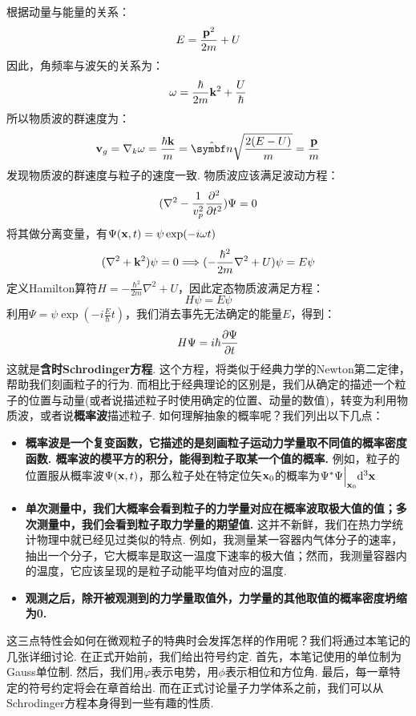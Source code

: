 根据动量与能量的关系：
\[
E = \frac{\mathbf{p}^2}{2m} + U
\]
因此，角频率与波矢的关系为：
\[
\omega = \frac{\hbar}{2m}\mathbf{k}^2 + \frac{U}{\hbar}
\]
所以物质波的群速度为：
\[
\mathbf{v}_{g} = \nabla_{k}\omega = \frac{\hbar\vk}{m} = \uv{n}\sqrt{\frac{2(E-U)}{m}} = \frac{\vp}{m}
\]
发现物质波的群速度与粒子的速度一致. 物质波应该满足波动方程：
\[
(\nabla^2-\frac{1}{v_{p}^2}\frac{\partial^{2} }{\partial{t}^{2}})\Psi = 0
\]
将其做分离变量，有\(\Psi(\mathbf{x},t) = \psi\exp(-i\omega t)\)
\[
(\nabla^2 + \mathbf{k}^2)\psi = 0 \Longrightarrow (-\frac{\hbar^2}{2m}\nabla^2+U)\psi = E\psi
\]
定义Hamilton算符\(H = -\frac{\hbar^2}{2m}\nabla^2+U\)，因此定态物质波满足方程：
\[
H\psi = E\psi
\]
利用\(\Psi=\psi\exp(-i\frac{E}{\hbar}t)\)，我们消去事先无法确定的能量\(E\)，得到：
\[
H\Psi = i\hbar\frac{\partial{\Psi}}{\partial{t}}
\]
这就是\textbf{含时Schrodinger方程}. 这个方程，将类似于经典力学的Newton第二定律，帮助我们刻画粒子的行为. 而相比于经典理论的区别是，我们从确定的描述一个粒子的位置与动量(或者说描述粒子时使用确定的位置、动量的数值)，转变为利用物质波，或者说\textbf{概率波}描述粒子. 如何理解抽象的概率呢？我们列出以下几点：
\begin{itemize}
    \item \textbf{概率波是一个复变函数，它描述的是刻画粒子运动力学量取不同值的概率密度函数. 概率波的模平方的积分，能得到粒子取某一个值的概率.} 例如，粒子的位置服从概率波\(\Psi(\mathbf{x},t)\)，那么粒子处在特定位矢\(\mathbf{x}_{0}\)的概率为\(\Psi^*\Psi\Big|_{\mathbf{x}_{0}}\dd^3\mathbf{x}\)
    \item \textbf{单次测量中，我们大概率会看到粒子的力学量对应在概率波取极大值的值；多次测量中，我们会看到粒子取力学量的期望值. }这并不新鲜，我们在热力学统计物理中就已经见过类似的特点. 例如，我测量某一容器内气体分子的速率，抽出一个分子，它大概率是取这一温度下速率的极大值；然而，我测量容器内的温度，它应该呈现的是粒子动能平均值对应的温度. 
    \item \textbf{观测之后，除开被观测到的力学量取值外，力学量的其他取值的概率密度坍缩为0. }
\end{itemize}
这三点特性会如何在微观粒子的特典时会发挥怎样的作用呢？我们将通过本笔记的几张详细讨论. 在正式开始前，我们给出符号约定. 首先，本笔记使用的单位制为Gauss单位制. 然后，我们用\(\varphi\)表示电势，用\(\phi\)表示相位和方位角. 最后，每一章特定的符号约定将会在章首给出. 而在正式讨论量子力学体系之前，我们可以从Schrodinger方程本身得到一些有趣的性质. 

